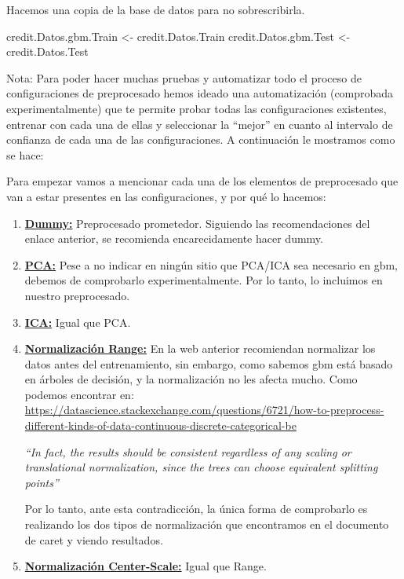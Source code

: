 \documentclass[
]{article}
\newenvironment{Shaded}{\begin{snugshade}}{\end{snugshade}}
\newcommand{\NormalTok}[1]{#1}
\newcommand{\OtherTok}[1]{\textcolor[rgb]{0.56,0.35,0.01}{#1}}
\begin{document}
Hacemos una copia de la base de datos para no sobrescribirla.

\begin{Shaded}
\begin{Highlighting}[]
\NormalTok{credit.Datos.gbm.Train }\OtherTok{\textless{}{-}}\NormalTok{ credit.Datos.Train}
\NormalTok{credit.Datos.gbm.Test }\OtherTok{\textless{}{-}}\NormalTok{ credit.Datos.Test}
\end{Highlighting}
\end{Shaded}

Nota: Para poder hacer muchas pruebas y automatizar todo el proceso de
configuraciones de preprocesado hemos ideado una automatización
(comprobada experimentalmente) que te permite probar todas las
configuraciones existentes, entrenar con cada una de ellas y seleccionar
la ``mejor'' en cuanto al intervalo de confianza de cada una de las
configuraciones. A continuación le mostramos como se hace:

Para empezar vamos a mencionar cada una de los elementos de preprocesado
que van a estar presentes en las configuraciones, y por qué lo hacemos:

\begin{enumerate}
\def\labelenumi{\arabic{enumi}.}
\item
  \ul{\textbf{Dummy:}} Preprocesado prometedor. Siguiendo las
  recomendaciones del enlace anterior, se recomienda encarecidamente
  hacer dummy.
\item
  \ul{\textbf{PCA:}} Pese a no indicar en ningún sitio que PCA/ICA sea
  necesario en gbm, debemos de comprobarlo experimentalmente. Por lo
  tanto, lo incluimos en nuestro preprocesado.
\item
  \ul{\textbf{ICA:}} Igual que PCA.
\item
  \ul{\textbf{Normalización Range:}} En la web anterior recomiendan
  normalizar los datos antes del entrenamiento, sin embargo, como
  sabemos gbm está basado en árboles de decisión, y la normalización no
  les afecta mucho. Como podemos encontrar en:
  \protect\hyperlink{0}{https://datascience.stackexchange.com/questions/6721/how-to-preprocess-different-kinds-of-data-continuous-discrete-categorical-be}

  \emph{``In fact, the results should be consistent regardless of any
  scaling or translational normalization, since the trees can choose
  equivalent splitting points''}

  Por lo tanto, ante esta contradicción, la única forma de comprobarlo
  es realizando los dos tipos de normalización que encontramos en el
  documento de caret y viendo resultados.
\item
  \ul{\textbf{Normalización Center-Scale:}} Igual que Range.
\end{enumerate}
\end{document}
